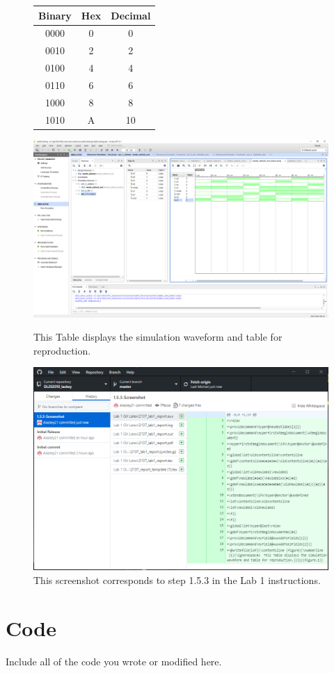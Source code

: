 \documentclass[11pt]{article}
\begin{document}
\begin{figure}[ht]\centering
	\begin{tabular}{c|c|c}
		\toprule
		Binary & Hex & Decimal \\
		\midrule
		0000 & 0 & 0 \\
		0010 & 2 & 2 \\
		0100 & 4 & 4 \\
		0110 & 6 & 6 \\
		1000 & 8 & 8 \\
		1010 & A & 10 \\
		\bottomrule
	\end{tabular} 
	
	\includegraphics[scale=0.75, trim=18.5cm 15.5cm 0.5cm 4.5cm, clip]{lab1_example_screenshot}	
	\caption{ This Table displays the simulation waveform and table for reproduction.}
	\includegraphics[scale=0.60]{Screenshot}	
	\caption{ This screenshot corresponds to step 1.5.3 in the Lab 1 instructions.}
\end{figure}


\section*{Code}

Include all of the code you wrote or modified here.
\end{document}
